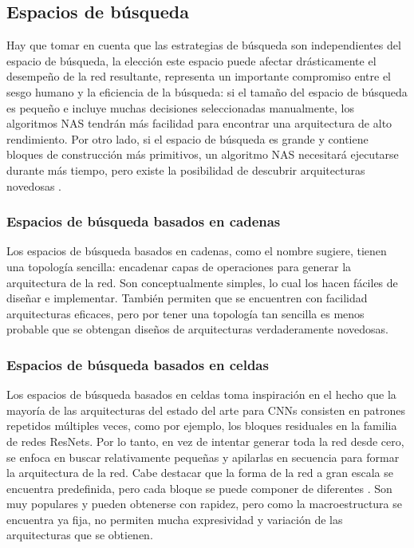 \subsection{Espacios de búsqueda}
Hay que tomar en cuenta que las estrategias de búsqueda son independientes del espacio de búsqueda, la elección este espacio puede afectar drásticamente el desempeño de la red resultante, representa un importante compromiso entre el sesgo humano y la eficiencia de la búsqueda: si el tamaño del espacio de búsqueda es pequeño e incluye muchas decisiones seleccionadas manualmente, los algoritmos NAS tendrán más facilidad para encontrar una arquitectura de alto rendimiento. Por otro lado, si el espacio de búsqueda es grande y contiene bloques de construcción más primitivos, un algoritmo NAS necesitará ejecutarse durante más tiempo, pero existe la posibilidad de descubrir arquitecturas novedosas \cite{white_neural_2023}.

\subsubsection{Espacios de búsqueda basados en cadenas}
Los espacios de búsqueda basados en cadenas, como el nombre sugiere, tienen una topología sencilla: encadenar capas de operaciones para generar la arquitectura de la red. Son conceptualmente simples, lo cual los hacen fáciles de diseñar e implementar. También permiten que se encuentren con facilidad arquitecturas eficaces, pero por tener una topología tan sencilla es menos probable que se obtengan diseños de arquitecturas verdaderamente novedosas.

\subsubsection{Espacios de búsqueda basados en celdas}
Los espacios de búsqueda basados en celdas toma inspiración en el hecho que la mayoría de las arquitecturas del estado del arte para CNNs consisten en patrones repetidos múltiples veces, como por ejemplo, los bloques residuales en la familia de redes ResNets. Por lo tanto, en vez de intentar generar toda la red desde cero, se enfoca en buscar  relativamente pequeñas y apilarlas en secuencia para formar la arquitectura de la red. Cabe destacar que la forma de la red a gran escala se encuentra predefinida, pero cada bloque se puede componer de diferentes . Son muy populares y pueden obtenerse con rapidez, pero como la macroestructura se encuentra ya fija, no permiten mucha expresividad y variación de las arquitecturas que se obtienen.

